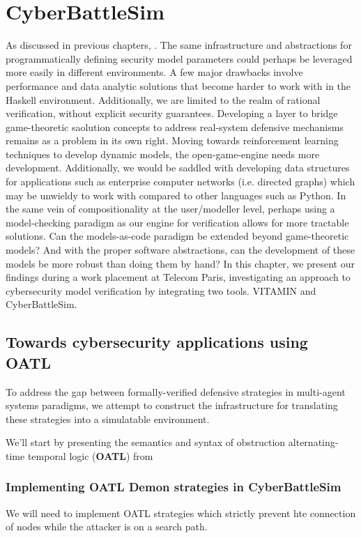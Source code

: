 \section{CyberBattleSim}
As discussed in previous chapters, . The same infrastructure and abstractions for programmatically defining security model parameters could perhaps be leveraged more easily in different environments. A few major drawbacks involve performance and data analytic solutions that become harder to work with in the Haskell environment. Additionally, we are limited to the realm of rational verification, without explicit security guarantees. Developing a layer to bridge game-theoretic saolution concepts to address real-system defensive mechanisms remains as a problem in its own right. Moving towards reinforcement learning techniques to develop dynamic models, the open-game-engine needs more development. Additionally, we would be saddled with developing data structures for applications such as enterprise computer networks (i.e. directed graphs) which may be unwieldy to work with compared to other languages such as Python. In the same vein of compositionality at the user/modeller level, perhaps using a model-checking paradigm as our engine for verification allows for more tractable solutions. Can the models-as-code paradigm be extended beyond game-theoretic models? And with the proper software abstractions, can the development of these models be more robust than doing them by hand? In this chapter, we present our findings during a work placement at Telecom Paris, investigating an approach to cybersecurity model verification by integrating two tools. VITAMIN and CyberBattleSim. 



\subsection{Towards cybersecurity applications using \textbf{OATL}}
To address the gap between formally-verified defensive strategies in multi-agent systems paradigms, we attempt to construct the infrastructure for translating these strategies into a simulatable environment. 

We'll start by presenting the semantics and syntax of obstruction alternating-time temporal logic (\textbf{OATL}) from \cite{catta2024obstruction}

\subsubsection{Implementing OATL Demon strategies in CyberBattleSim}
We will need to implement OATL strategies which strictly prevent hte connection of nodes while the attacker is on a search path. 

